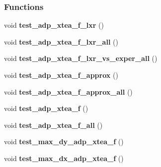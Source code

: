 \subsubsection*{\-Functions}
\begin{DoxyCompactItemize}
\item 
\hypertarget{adp-xtea-f-fk-tests_8cc_a8d4a8dd46aa33de0e271dbe43994e610}{void {\bfseries test\-\_\-adp\-\_\-xtea\-\_\-f\-\_\-lxr} ()}\label{adp-xtea-f-fk-tests_8cc_a8d4a8dd46aa33de0e271dbe43994e610}

\item 
\hypertarget{adp-xtea-f-fk-tests_8cc_af7600532e280f8b927952458825b42af}{void {\bfseries test\-\_\-adp\-\_\-xtea\-\_\-f\-\_\-lxr\-\_\-all} ()}\label{adp-xtea-f-fk-tests_8cc_af7600532e280f8b927952458825b42af}

\item 
\hypertarget{adp-xtea-f-fk-tests_8cc_a3d48e889ecea2c2e9192303819120712}{void {\bfseries test\-\_\-adp\-\_\-xtea\-\_\-f\-\_\-lxr\-\_\-vs\-\_\-exper\-\_\-all} ()}\label{adp-xtea-f-fk-tests_8cc_a3d48e889ecea2c2e9192303819120712}

\item 
\hypertarget{adp-xtea-f-fk-tests_8cc_a1055d124bef98f36eaa363fa8c5fee5c}{void {\bfseries test\-\_\-adp\-\_\-xtea\-\_\-f\-\_\-approx} ()}\label{adp-xtea-f-fk-tests_8cc_a1055d124bef98f36eaa363fa8c5fee5c}

\item 
\hypertarget{adp-xtea-f-fk-tests_8cc_a335962cd04ab85ca86ad2f9432bc0de7}{void {\bfseries test\-\_\-adp\-\_\-xtea\-\_\-f\-\_\-approx\-\_\-all} ()}\label{adp-xtea-f-fk-tests_8cc_a335962cd04ab85ca86ad2f9432bc0de7}

\item 
\hypertarget{adp-xtea-f-fk-tests_8cc_a4d0897597d817de94806e89fa8bfdd3b}{void {\bfseries test\-\_\-adp\-\_\-xtea\-\_\-f} ()}\label{adp-xtea-f-fk-tests_8cc_a4d0897597d817de94806e89fa8bfdd3b}

\item 
\hypertarget{adp-xtea-f-fk-tests_8cc_acfee551a6d21caf96a6590953b65ba7a}{void {\bfseries test\-\_\-adp\-\_\-xtea\-\_\-f\-\_\-all} ()}\label{adp-xtea-f-fk-tests_8cc_acfee551a6d21caf96a6590953b65ba7a}

\item 
\hypertarget{adp-xtea-f-fk-tests_8cc_a569ddf9c54cf64dd08d579f42ae51c2f}{void {\bfseries test\-\_\-max\-\_\-dy\-\_\-adp\-\_\-xtea\-\_\-f} ()}\label{adp-xtea-f-fk-tests_8cc_a569ddf9c54cf64dd08d579f42ae51c2f}

\item 
\hypertarget{adp-xtea-f-fk-tests_8cc_a2aca93e860162f3a98934570bba50de5}{void {\bfseries test\-\_\-max\-\_\-dx\-\_\-adp\-\_\-xtea\-\_\-f} ()}\label{adp-xtea-f-fk-tests_8cc_a2aca93e860162f3a98934570bba50de5}


\end{DoxyCompactItemize}
